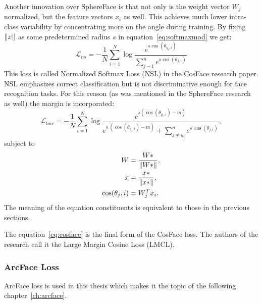 Another innovation over SphereFace is that not only is the weight vector $W_j$ normalized, but the feature vectors
$x_i$ as well.
This achieves much lower intra-class variability by concentrating more on the angle during training.
By fixing $\left\lVert x\right\rVert$ as some predetermined radius $s$ in equation~\ref{eq:softmaxmod} we get:
\begin{equation}
    \mathcal{L}_{ns} = -\frac{1}{N} \sum_{i=1}^{N} \log \frac{e^{s \cos(\theta_{y_i,i})}}
    {\sum_{j-1}^{n} e^{s \cos(\theta_{j,i})}}
\end{equation}
This loss is called Normalized Softmax Loss (NSL) in the CosFace research paper.
NSL emphasizes correct classification but is not discriminative enough for face recognition tasks.
For this reason (as was mentioned in the SphereFace research as well) the margin is incorporated:
\begin{equation}
    \label{eq:cosface}
    \mathcal{L}_{lmc} = -\frac{1}{N} \sum_{i=1}^{N} \log \frac{e^{s \left( \cos(\theta_{y_i,i}) - m \right)}}
    {e^{s\ \left( \cos(\theta_{y_i,i}) - m \right)} + \sum_{j \neq y_i}^n e^{s\ \cos(\theta_{j,i})}},
\end{equation}
subject to
\begin{align}
    W &= \frac{W*}{\left\lVert W*\right\rVert}, \\
    x &= \frac{x*}{\left\lVert x*\right\rVert}, \\
    \cos(\theta_j, i) &= W_{j}^T x_i.
\end{align}
The meaning of the equation constituents is equivalent to those in the previous sections.

The equation~\ref{eq:cosface} is the final form of the CosFace loss.
The authors of the research call it the Large Margin Cosine Loss (LMCL).

\subsubsection{ArcFace Loss}\label{subsubsec:arcface}
ArcFace loss is used in this thesis which makes it the topic of the following chapter~\ref{ch:arcface}.